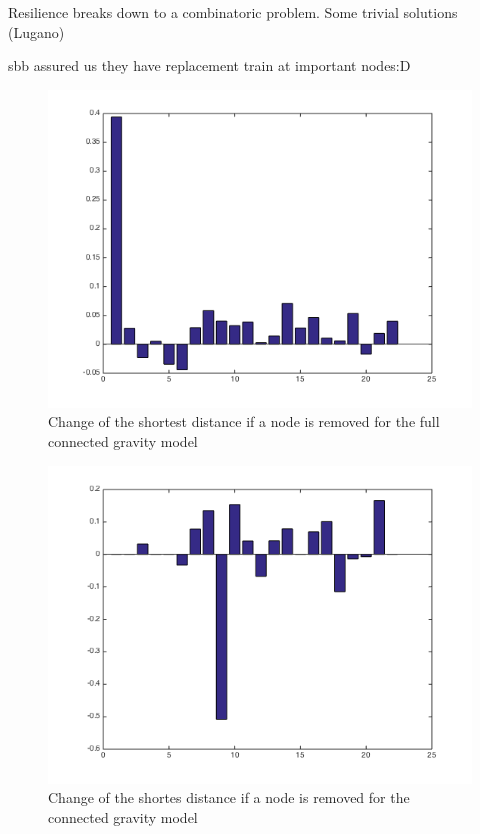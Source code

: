 \documentclass[11pt]{article}
\begin{document}
Resilience breaks down to a combinatoric problem. Some trivial solutions (Lugano)
 
 sbb assured us they have replacement train at important nodes:D

\begin{figure}
\includegraphics[scale=0.5]{fullConnedtedShortestNetworkDistanceChange}
 \caption{Change of the shortest distance if a node is removed for the full connected gravity model}
\end{figure}

\begin{figure}
\includegraphics[scale=0.5]{connectedNetworkDistanceChange}
 \caption{Change of the shortes distance if a node is removed for the connected gravity model}
\end{figure}
\end{document}
